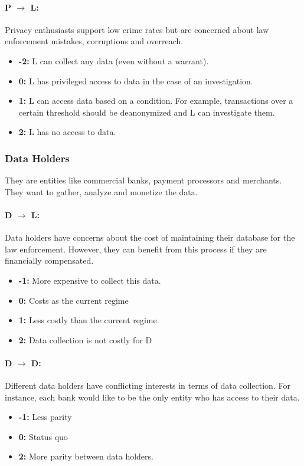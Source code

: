\documentclass[runningheads]{llncs}
\begin{document}
\paragraph{P $\rightarrow$ L:} Privacy enthusiasts support low crime rates but are concerned about law enforcement mistakes, corruptions and overreach.
   \begin{itemize}
	\item \textbf{-2:} L can collect any data (even without a warrant).
	\item \textbf{0:}  L has privileged access to data in the case of an investigation.
	\item \textbf{1:} L can access data based on a condition. For example, transactions over a certain threshold should be deanonymized and L can investigate them.
	\item \textbf{2:} L has no access to data.
\end{itemize}

 \subsubsection{Data Holders} 
 They are entities like commercial banks, payment processors and merchants. They want to gather, analyze and monetize the data.
 \paragraph{D $\rightarrow$ L:}
 Data holders have concerns about the cost of maintaining their database for the law enforcement. However, they can benefit from this process if they are financially compensated.
   \begin{itemize}
 	\item \textbf{-1:} More expensive to collect this data.
 	\item \textbf{0:} Costs as the current regime
 	\item \textbf{1:} Less costly than the current regime.
 	\item \textbf{2:} Data collection is not costly for D
 \end{itemize}
  \paragraph{D $\rightarrow$ D:}
 Different data holders have conflicting interests in terms of data collection. For instance, each bank would like to be the only entity who has access to their data.
    \begin{itemize}
 	\item \textbf{-1:} Less parity
 	\item \textbf{0:}  Status quo
 	\item \textbf{2:} More parity between data holders.
 	


 \end{itemize}
 
\end{document}
